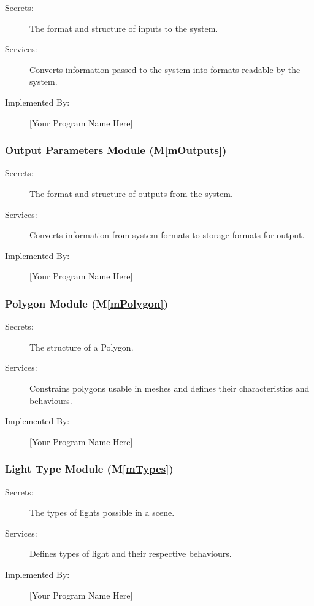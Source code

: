 \documentclass[12pt, titlepage]{article}
\newcommand{\mref}[1]{M\ref{#1}}
\begin{document}
\begin{description}
	\item[Secrets:]The format and structure of inputs to the system.
	\item[Services:]Converts information passed to the system into formats 
	readable by the system.
	\item[Implemented By:] [Your Program Name Here]
\end{description}

\subsubsection{Output Parameters Module (\mref{mOutputs})}

\begin{description}
	\item[Secrets:]The format and structure of outputs from the system.
	\item[Services:]Converts information from system formats to storage formats 
	for output.
	\item[Implemented By:] [Your Program Name Here]
\end{description}

\subsubsection{Polygon Module (\mref{mPolygon})}
\begin{description}
	\item[Secrets:]The structure of a Polygon.
	\item[Services:]Constrains polygons usable in meshes and defines their 
	characteristics and behaviours.
	\item[Implemented By:] [Your Program Name Here]
\end{description}

\subsubsection{Light Type Module (\mref{mTypes})}
\begin{description}
	\item[Secrets:]The types of lights possible in a scene.
	\item[Services:]Defines types of light and their respective behaviours.
	\item[Implemented By:] [Your Program Name Here]
\end{description}
\end{document}
